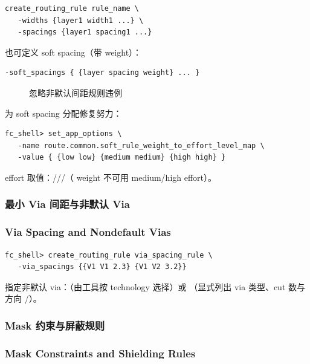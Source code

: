 \begin{lstlisting}
create_routing_rule rule_name \
   -widths {layer1 width1 ...} \
   -spacings {layer1 spacing1 ...}
\end{lstlisting}

也可定义 soft spacing（带 weight）：
\begin{lstlisting}
-soft_spacings { {layer spacing weight} ... }
\end{lstlisting}

\begin{figure}[htbp]
\centering
{}
\caption{忽略非默认间距规则违例}
\label{fig:ignore-ndr-spacing}
\end{figure}

为 soft spacing 分配修复努力：
\begin{lstlisting}
fc_shell> set_app_options \
   -name route.common.soft_rule_weight_to_effort_level_map \
   -value { {low low} {medium medium} {high high} }
\end{lstlisting}
effort 取值：\cmd{off}///（ weight 不可用 medium/high effort）。

\subsubsection{最小 Via 间距与非默认 Via}
\subsubsection*{Via Spacing and Nondefault Vias}

\begin{lstlisting}
fc_shell> create_routing_rule via_spacing_rule \
   -via_spacings {{V1 V1 2.3} {V1 V2 3.2}}
\end{lstlisting}

指定非默认 via：（由工具按 technology 选择）或 （显式列出 via 类型、cut 数与方向 /）。

\subsubsection{Mask 约束与屏蔽规则}
\subsubsection*{Mask Constraints and Shielding Rules}

